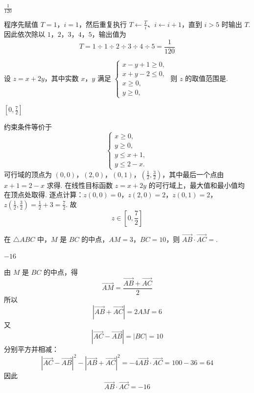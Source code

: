 \begin{answer}
\(\frac{1}{120}\)
\end{answer}

\begin{solution}
程序先赋值 \(T=1\)，\(i=1\)，然后重复执行 \(T\leftarrow \frac{T}{i}\)、\(i\leftarrow i+1\)，直到 \(i>5\) 时输出 \(T\). 因此依次除以 \(1\)，\(2\)，\(3\)，\(4\)，\(5\)，输出值为
\[
T=1\div1\div2\div3\div4\div5=\frac1{120}
\]
\end{solution}

\begin{problem}
设 \(z = x + 2y\)，其中实数 \(x\)，\(y\) 满足 \(\begin{cases}
x - y + 1 \geqslant 0,\\
x + y - 2 \leqslant 0,\\
x \geqslant 0,\\
y \geqslant 0,
\end{cases}\) 则 \(z\) 的取值范围是\fillinblank{}.
\end{problem}

\begin{answer}
\(\left[0, \frac{7}{2}\right]\)
\end{answer}

\begin{solution}
约束条件等价于
\[
\begin{cases}
x\geq0,\\
y\geq0,\\
y\leq x+1,\\
y\leq2-x.
\end{cases}
\]
可行域的顶点为 \((0,0)\)，\((2,0)\)，\((0,1)\)，\(\left(\frac12,\frac32\right)\)，其中最后一个点由 \(x+1=2-x\) 求得. 在线性目标函数 \(z=x+2y\) 的可行域上，最大值和最小值均在顶点处取得. 逐点计算：\(z(0,0)=0\)，\(z(2,0)=2\)，\(z(0,1)=2\)，\(z\left(\frac12,\frac32\right)=\frac12+3=\frac72\).
故
\[
z\in\left[0,\frac72\right]
\]
\end{solution}

\begin{problem}
在 \(\triangle ABC\) 中，\(M\) 是 \(BC\) 的中点，\(AM = 3\)，\(BC = 10\)，则 \(\overrightarrow{AB} \cdot \overrightarrow{AC} = \)\fillinblank{}.
\end{problem}

\begin{answer}
\(-16\)
\end{answer}

\begin{solution}
由 \(M\) 是 \(BC\) 的中点，得
\[
\overrightarrow{AM}=\frac{\overrightarrow{AB}+\overrightarrow{AC}}2
\]
所以
\[
|\overrightarrow{AB}+\overrightarrow{AC}|=2AM=6
\]
又
\[
|\overrightarrow{AC}-\overrightarrow{AB}|=|BC|=10
\]
分别平方并相减：
\[
|\overrightarrow{AC}-\overrightarrow{AB}|^2-
|\overrightarrow{AB}+\overrightarrow{AC}|^2
=-4\overrightarrow{AB}\cdot\overrightarrow{AC}=100-36=64
\]
因此
\[
\overrightarrow{AB}\cdot\overrightarrow{AC}=-16
\]
\end{solution}

